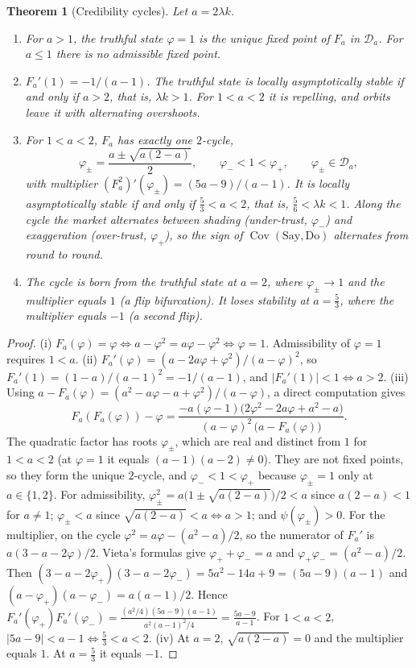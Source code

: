 \documentclass[11pt,a4paper]{article}
\theoremstyle{plain}
\newtheorem{theorem}{Theorem}[section]
\theoremstyle{definition}
\theoremstyle{remark}
\DeclareMathOperator{\Cov}{Cov}
\begin{document}
\begin{theorem}[Credibility cycles]\label{thm:cycles}
Let $a=2\lambda k$.
\begin{enumerate}[label=(\roman*)]
  \item For $a>1$, the truthful state $\varphi=1$ is the unique fixed point of $F_a$ in $\mathcal{D}_a$. For $a\le1$ there is no admissible fixed point.
  \item $F_a'(1)=-1/(a-1)$. The truthful state is locally asymptotically stable if and only if $a>2$, that is, $\lambda k>1$. For $1<a<2$ it is repelling, and orbits leave it with alternating overshoots.
  \item For $1<a<2$, $F_a$ has exactly one $2$-cycle,
  \[
    \varphi_\pm=\frac{a\pm\sqrt{a(2-a)}}{2},\qquad \varphi_-<1<\varphi_+,\qquad \varphi_\pm\in\mathcal{D}_a,
  \]
  with multiplier $(F_a^{2})'(\varphi_\pm)=(5a-9)/(a-1)$. It is locally asymptotically stable if and only if $\tfrac53<a<2$, that is, $\tfrac56<\lambda k<1$. Along the cycle the market alternates between shading (under-trust, $\varphi_-$) and exaggeration (over-trust, $\varphi_+$), so the sign of $\Cov(\text{Say},\text{Do})$ alternates from round to round.
  \item The cycle is born from the truthful state at $a=2$, where $\varphi_\pm\to1$ and the multiplier equals $1$ (a flip bifurcation). It loses stability at $a=\tfrac53$, where the multiplier equals $-1$ (a second flip).
\end{enumerate}
\end{theorem}
\begin{proof}
(i) $F_a(\varphi)=\varphi\iff a-\varphi^2=a\varphi-\varphi^2\iff\varphi=1$. Admissibility of $\varphi=1$ requires $1<a$.
(ii) $F_a'(\varphi)=(a-2a\varphi+\varphi^2)/(a-\varphi)^2$, so $F_a'(1)=(1-a)/(a-1)^2=-1/(a-1)$, and $|F_a'(1)|<1\iff a>2$.
(iii) Using $a-F_a(\varphi)=(a^2-a\varphi-a+\varphi^2)/(a-\varphi)$, a direct computation gives
\[
  F_a(F_a(\varphi))-\varphi=\frac{-a(\varphi-1)\big(2\varphi^2-2a\varphi+a^2-a\big)}{(a-\varphi)^2\,\big(a-F_a(\varphi)\big)} .
\]
The quadratic factor has roots $\varphi_\pm$, which are real and distinct from $1$ for $1<a<2$ (at $\varphi=1$ it equals $(a-1)(a-2)\neq0$). They are not fixed points, so they form the unique $2$-cycle, and $\varphi_-<1<\varphi_+$ because $\varphi_\pm=1$ only at $a\in\{1,2\}$. For admissibility, $\varphi_\pm^2=a\big(1\pm\sqrt{a(2-a)}\big)/2<a$ since $a(2-a)<1$ for $a\neq1$; $\varphi_\pm<a$ since $\sqrt{a(2-a)}<a\iff a>1$; and $\psi(\varphi_\pm)>0$.
For the multiplier, on the cycle $\varphi^2=a\varphi-(a^2-a)/2$, so the numerator of $F_a'$ is $a(3-a-2\varphi)/2$. Vieta's formulas give $\varphi_++\varphi_-=a$ and $\varphi_+\varphi_-=(a^2-a)/2$. Then $(3-a-2\varphi_+)(3-a-2\varphi_-)=5a^2-14a+9=(5a-9)(a-1)$ and $(a-\varphi_+)(a-\varphi_-)=a(a-1)/2$. Hence $F_a'(\varphi_+)F_a'(\varphi_-)=\frac{(a^2/4)(5a-9)(a-1)}{a^2(a-1)^2/4}=\frac{5a-9}{a-1}$. For $1<a<2$, $|5a-9|<a-1\iff\tfrac53<a<2$.
(iv) At $a=2$, $\sqrt{a(2-a)}=0$ and the multiplier equals $1$. At $a=\tfrac53$ it equals $-1$.
\end{proof}
\end{document}
